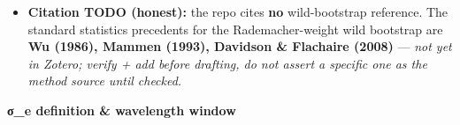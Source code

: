 \documentclass[
]{article}
\newcommand{\BreakablePath}[1]{{\ttfamily\sloppy #1}}
\begin{document}
\begin{itemize}
  \BreakablePath{results/\discretionary{}{}{}ppxf\_\discretionary{}{}{}bootstrap\_\discretionary{}{}{}errors\_\discretionary{}{}{}\{sps\}[\_\discretionary{}{}{}suffix].\discretionary{}{}{}npz},
  arrays shape (n\_degree, 500) for V/σ/χ²/z plus p16/p50/p84 summaries
  and asymmetric errors.
\item
  \textbf{Citation TODO (honest):} the repo cites \textbf{no}
  wild-bootstrap reference. The standard statistics precedents for the
  Rademacher-weight wild bootstrap are \textbf{Wu (1986), Mammen (1993),
  Davidson \& Flachaire (2008)} --- \emph{not yet in Zotero; verify +
  add before drafting, do not assert a specific one as the method source
  until checked.}
\end{itemize}

\textbf{σ\_e definition \& wavelength window}
\end{document}
